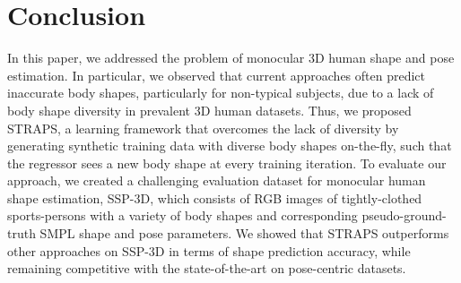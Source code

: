 \documentclass{bmvc2k}
\begin{document}
\section{Conclusion}
In this paper, we addressed the problem of monocular 3D human shape and pose estimation. In particular, we observed that current approaches often predict inaccurate body shapes, particularly for non-typical subjects, due to a lack of body shape diversity in prevalent 3D human datasets. Thus, we proposed STRAPS, a learning framework that overcomes the lack of diversity by generating synthetic training data with diverse body shapes on-the-fly, such that the regressor sees a new body shape at every training iteration. To evaluate our approach, we created a challenging evaluation dataset for monocular human shape estimation, SSP-3D, which consists of RGB images of tightly-clothed sports-persons with a variety of body shapes and corresponding pseudo-ground-truth SMPL shape and pose parameters. We showed that STRAPS outperforms other approaches on SSP-3D in terms of shape prediction accuracy, while remaining competitive with the state-of-the-art on pose-centric datasets.

\clearpage

\end{document}
